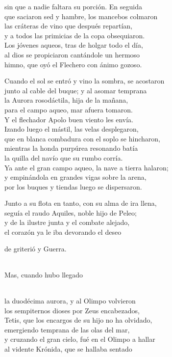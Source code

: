 \documentclass[11pt,twoside]{article}
\newcommand{\dlgo}[2]{\sbox{\dbox}{#1}\parbox[t]{\linewidth}{#1\strut\\[0pt]\hspace*{\wd\dbox}\hspace{\fontdimen2\font}#2\strut}}
\begin{document}
sin que a nadie faltara su porción. En seguida\\
que saciaron sed y hambre, los mancebos colmaron\\
las cráteras de vino que después repartían,\\
y a todos las primicias de la copa obsequiaron.\\
Los jóvenes aqueos, tras de holgar todo el día,\\
al dios se propiciaron cantándole un hermoso\\
himno, que oyó el Flechero con ánimo gozoso.\par
Cuando el sol se entró y vino la sombra, se acostaron\\
junto al cable del buque; y al asomar temprana\\
la Aurora rosodáctila, hija de la mañana,\\
para el campo aqueo, mar afuera tomaron.\\
Y el flechador Apolo buen viento les envía.\\
Izando luego el mástil, las velas desplegaron,\\
que en blanca combadura con el soplo se hincharon,\\
mientras la honda purpúrea resonando batía\\
la quilla del navío que su rumbo corría.\\
Ya ante el gran campo aqueo, la nave a tierra halaron;\\
y empinándola en grandes vigas sobre la arena,\\
por los buques y tiendas luego se dispersaron.\par
Junto a su flota en tanto, con su alma de ira llena,\\
seguía el raudo Aquiles, noble hijo de Peleo;\\
y de la ilustre junta y el combate alejado,\\
el corazón ya le iba devorando el deseo\\
\dlgo{de griterió y Guerra.}{Mas, cuando hubo llegado}\\
la duodécima aurora, y al Olimpo volvieron\\
los sempiternos dioses por Zeus encabezados,\\
Tetis, que los encargos de su hijo no ha olvidado,\\
emergiendo temprana de las olas del mar,\\
y cruzando el gran cielo, fué en el Olimpo a hallar\\
al vidente Krónida, que se hallaba sentado\\
\end{document}
